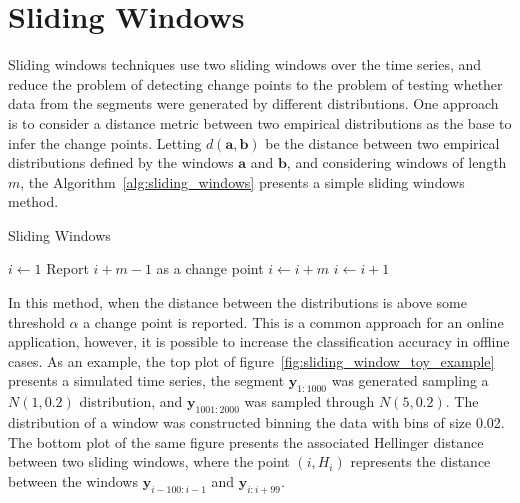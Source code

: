 \section{Sliding Windows}

Sliding windows techniques use two sliding windows over the time series, and reduce the problem of detecting change points to the problem of testing whether data from the segments were generated by different distributions. One approach is to consider a distance metric between two empirical distributions as the base to infer the change points. Letting $d(\mathbf{a}, \mathbf{b})$ be the distance between two empirical distributions defined by the windows $\mathbf{a}$ and $\mathbf{b}$, and considering windows of length $m$, the Algorithm~\ref{alg:sliding_windows} presents a simple sliding windows method.

\begin{algorithm}
    \caption{Sliding Windows}
    \label{alg:sliding_windows}
	\begin{algorithmic}[1]
		\State $i \gets 1$
                \State Report $i + m - 1$ as a change point
		        \State $i \gets i + m$
             \Else
		        \State $i \gets i + 1$
             \EndIf
        \EndWhile
	\end{algorithmic}
\end{algorithm}

In this method, when the distance between the distributions is above some threshold $\alpha$ a change point is reported. This is a common approach for an online application, however, it is possible to increase the classification accuracy in offline cases. As an example, the top plot of figure~\ref{fig:sliding_window_toy_example} presents a simulated time series, the segment $\mathbf{y}_{1 : 1000}$ was generated sampling a $N(1, 0.2)$ distribution, and $\mathbf{y}_{1001 : 2000}$ was sampled through $N(5, 0.2)$. The distribution of a window was constructed binning the data with bins of size 0.02. The bottom plot of the same figure presents the associated Hellinger distance \cite{hellinger_distance} between two sliding windows, where the point $(i, H_{i})$ represents the distance between the windows $\mathbf{y}_{i - 100 : i - 1}$ and $\mathbf{y}_{i : i + 99}$.

